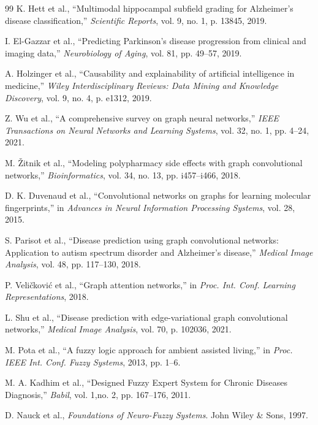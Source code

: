 \documentclass[pdflatex,sn-mathphys-num]{sn-jnl}
\begin{document}
\begin{thebibliography}{99}
K. Hett et al., ``Multimodal hippocampal subfield grading for Alzheimer's disease classification,'' \textit{Scientific Reports}, vol. 9, no. 1, p. 13845, 2019.

I. El-Gazzar et al., ``Predicting Parkinson's disease progression from clinical and imaging data,'' \textit{Neurobiology of Aging}, vol. 81, pp. 49--57, 2019.

A. Holzinger et al., ``Causability and explainability of artificial intelligence in medicine,'' \textit{Wiley Interdisciplinary Reviews: Data Mining and Knowledge Discovery}, vol. 9, no. 4, p. e1312, 2019.

Z. Wu et al., ``A comprehensive survey on graph neural networks,'' \textit{IEEE Transactions on Neural Networks and Learning Systems}, vol. 32, no. 1, pp. 4--24, 2021.

M. Žitnik et al., ``Modeling polypharmacy side effects with graph convolutional networks,'' \textit{Bioinformatics}, vol. 34, no. 13, pp. i457--i466, 2018.

D. K. Duvenaud et al., ``Convolutional networks on graphs for learning molecular fingerprints,'' in \textit{Advances in Neural Information Processing Systems}, vol. 28, 2015.

S. Parisot et al., ``Disease prediction using graph convolutional networks: Application to autism spectrum disorder and Alzheimer's disease,'' \textit{Medical Image Analysis}, vol. 48, pp. 117--130, 2018.

P. Veličković et al., ``Graph attention networks,'' in \textit{Proc. Int. Conf. Learning Representations}, 2018.

L. Shu et al., ``Disease prediction with edge-variational graph convolutional networks,'' \textit{Medical Image Analysis}, vol. 70, p. 102036, 2021.

M. Pota et al., ``A fuzzy logic approach for ambient assisted living,'' in \textit{Proc. IEEE Int. Conf. Fuzzy Systems}, 2013, pp. 1--6.

M. A. Kadhim et al., ``Designed Fuzzy Expert System for Chronic Diseases Diagnosis,'' \textit{Babil}, vol. 1,no. 2, pp. 167--176, 2011.

D. Nauck et al., \textit{Foundations of Neuro-Fuzzy Systems}. John Wiley \& Sons, 1997.


\end{thebibliography}
\end{document}
